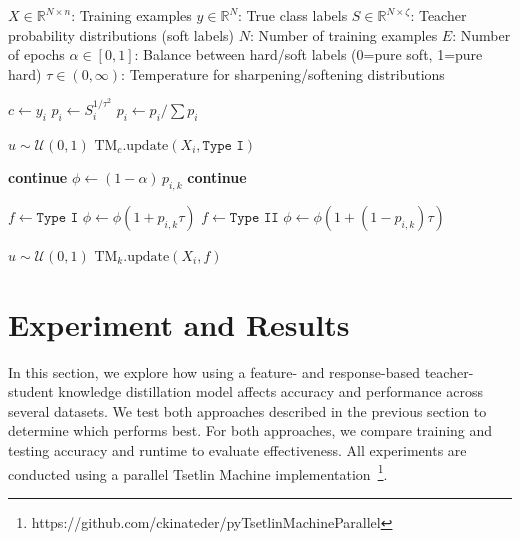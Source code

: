 \documentclass[sn-mathphys-num]{sn-jnl}%
\theoremstyle{thmstyleone}%
\theoremstyle{thmstyletwo}%
\theoremstyle{thmstylethree}%
\begin{document}
\begin{algorithm}[htbp]
	\caption{Tsetlin Machine fit method using soft label distributions}
	\label{algo:fit-soft}
	\begin{algorithmic}[1]
		\Require $X\in\mathbb{R}^{N \times n}$: Training examples
		\Require $y\in\mathbb{R}^{N}$: True class labels
		\Require $S\in\mathbb{R}^{N \times \zeta}$: Teacher probability distributions (soft labels)
		\Require $N$: Number of training examples
		\Require $E$: Number of epochs
		\Require $\alpha \in [0,1]$: Balance between hard/soft labels (0=pure soft, 1=pure hard)
		\Require $\tau \in (0,\infty)$: Temperature for sharpening/softening distributions
		
		\State $c \gets y_i$ 
		\State $p_i \gets S_i^{1/\tau^2}$ 
		\State $p_i \gets p_i / \sum p_i$ 
		
		\State $u \sim \mathcal{U}(0,1)$
		\State $\text{TM}_c.\text{update}(X_i, \texttt{Type I})$
		\EndIf
		
		 
		\State \textbf{continue}
		\EndIf
		\State $\phi \gets (1 - \alpha) \, p_{i,k}$ 
		 
		\State \textbf{continue}
		\EndIf
		
		\State $f \gets \texttt{Type I}$ 
		\State $\phi \gets \phi (1 + p_{i,k} \tau)$
		\Else
		\State $f \gets \texttt{Type II}$ 
		\State $\phi \gets \phi (1 + (1 - p_{i,k}) \tau)$
		\EndIf
		
		\State $u \sim \mathcal{U}(0,1)$ 
		\State $\text{TM}_k.\text{update}(X_i, f)$
		\EndIf
		\EndFor
		\EndFor
		\EndFor
		\EndFunction
	\end{algorithmic}
\end{algorithm}

\section{Experiment and Results}
In this section, we explore how using a feature- and response-based teacher-student knowledge distillation model affects accuracy and performance across several datasets. We test both approaches described in the previous section to determine which performs best. For both approaches, we compare training and testing accuracy and runtime to evaluate effectiveness. All experiments are conducted using a parallel Tsetlin Machine implementation~\footnote{https://github.com/ckinateder/pyTsetlinMachineParallel}. 
\end{document}
